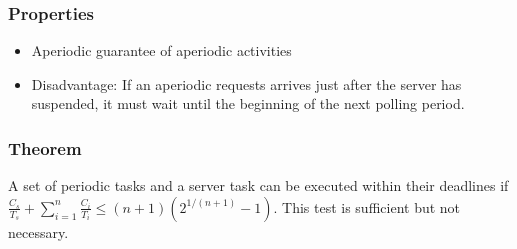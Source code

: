 \subsubsection{Properties}
\begin{itemize}[noitemsep]
\item Aperiodic guarantee of aperiodic activities
\item Disadvantage: If an aperiodic requests arrives just after the 
server has suspended, it must wait until the beginning of the 
next polling period.
\end{itemize}

\subsubsection{Theorem}
\begin{theorem}
A set of periodic tasks and a server task can be executed 
within their deadlines if $\frac{C_s}{T_s} + \sum\limits_{i = 1}^{n} \frac{C_i}{T_i} \leq (n+1)(2^{1/(n+1)} -1)$. This test is sufficient but not necessary.
\end{theorem}

